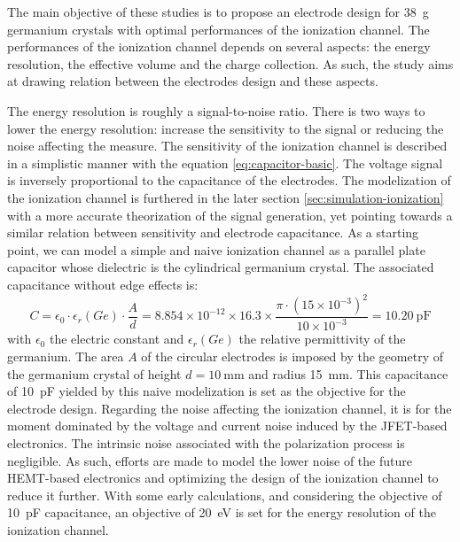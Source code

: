 The main objective of these studies is to propose an electrode design for \SI{38}{\g} germanium crystals with optimal performances of the ionization channel. The performances of the ionization channel depends on several aspects: the energy resolution, the effective volume and the charge collection. As such, the study aims at drawing relation between the electrodes design and these aspects.

The energy resolution is roughly a signal-to-noise ratio. There is two ways to lower the energy resolution: increase the sensitivity to the signal or reducing the noise affecting the measure.
The sensitivity of the ionization channel is described in a simplistic manner with the equation \ref{eq:capacitor-basic}. The voltage signal is inversely proportional to the capacitance of the electrodes. The modelization of the ionization channel is furthered in the later section \ref{sec:simulation-ionization} with a more accurate theorization of the signal generation, yet pointing towards a similar relation between sensitivity and electrode capacitance. As a starting point, we can model a simple and naive ionization channel as a parallel plate capacitor whose dielectric is the cylindrical germanium crystal. The associated capacitance without edge effects is:
\begin{equation}
\label{eq:parrallel-plate-capacitor}
C = \epsilon_0 \cdot \epsilon_r(Ge) \cdot \frac{A}{d}
=
8.854 \times 10^{-12} \times 16.3 \times \frac{\pi \cdot (15 \times 10^{-3})^2}{10 \times 10^{-3}}
=
\SI{10.20}{\pico\farad}
\end{equation}
with $\epsilon_0$ the electric constant and $\epsilon_r(Ge)$ the relative permittivity of the germanium. The area $A$ of the circular electrodes is imposed by the geometry of the germanium crystal of height $d=\SI{10}{\mm}$ and radius \SI{15}{\mm}. This capacitance of \SI{10}{\pico\farad} yielded by this naive modelization is set as the objective for the electrode design. 
Regarding the noise affecting the ionization channel, it is for the moment dominated by the voltage and current noise induced by the JFET-based electronics. The intrinsic noise associated with the polarization process is negligible. As such, efforts are made to model the lower noise of the future HEMT-based electronics and optimizing the design of the ionization channel to reduce it further. With some early calculations, and considering the objective of \SI{10}{\pico\farad} capacitance, an objective of \SI{20}{\eV} is set for the energy resolution of the ionization channel.

